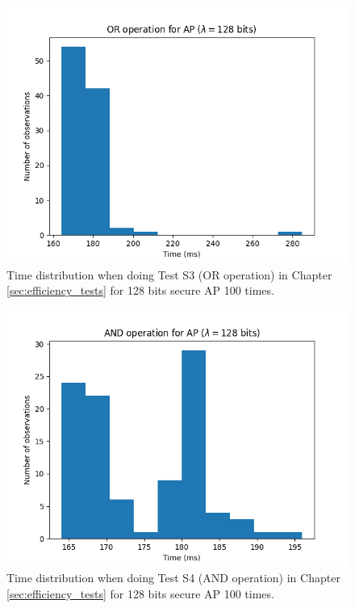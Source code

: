 \begin{figure}[ht]
    \centering
    \includegraphics[width=0.8\linewidth]{data/figures/AP_STD128_OR_operation.png}
    \caption{Time distribution when doing Test S3 (OR operation) in Chapter \ref{sec:efficiency_tests} for 128 bits secure AP 100 times.}
    \label{fig:distr_ap128_or}
\end{figure}

\begin{figure}[ht]
    \centering
    \includegraphics[width=0.8\linewidth]{data/figures/AP_STD128_AND_operation.png}
    \caption{Time distribution when doing Test S4 (AND operation) in Chapter \ref{sec:efficiency_tests} for 128 bits secure AP 100 times.}
    \label{fig:distr_ap128_and}
\end{figure}

